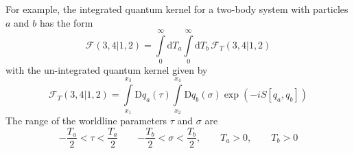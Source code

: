 For example, the integrated quantum kernel for a two-body system with particles $a$ and $b$ has the form
\begin{equation}
	\mathcal{F}(3, 4|1, 2) = \int\limits_{0}^{\infty} \mathrm{d}T_{a} \int\limits_{0}^{\infty} \mathrm{d}T_{b} \, \mathcal{F}_{T}(3, 4|1, 2)
\end{equation}
with the un-integrated quantum kernel given by
\begin{equation}
	\mathcal{F}_{T}(3, 4|1, 2) = \int\limits_{x_{1}}^{x_{3}} \mathrm{D}q_{a}(\tau) \int\limits_{x_{2}}^{x_{4}} \mathrm{D}q_{b}(\sigma) \exp{\left( - i S[q_{a}, q_{b}] \right)}
\end{equation}
The range of the worldline parameters $\tau$ and $\sigma$ are
\begin{equation}
	{- \frac{T_{a}}{2} } < \tau < \frac{T_{a}}{2} \qquad {- \frac{T_{b}}{2} } < \sigma < \frac{T_{b}}{2}, \qquad T_{a} > 0, \qquad T_{b} > 0
\end{equation}